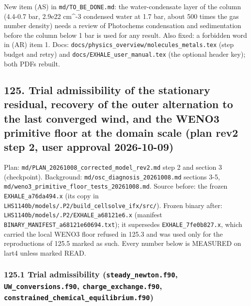 \documentclass[english,a4paper]{my_memo}
\begin{document}
New item (AS) in \texttt{md/TO\_BE\_DONE.md}: the water-condensate layer of the column
(4.4-0.7 bar, 2.9e22 cm\^{}-3 condensed water at 1.7 bar, about 500 times the gas
number density) needs a review of Photochem\textquotesingle s condensation and sedimentation before
the column below 1 bar is used for any result. Also fixed: a forbidden word in
(AR) item 1. Docs: \texttt{docs/physics\_overview/molecules\_metals.tex} (step budget and
retry) and \texttt{docs/EXHALE\_user\_manual.tex} (the optional header key); both PDFs
rebuilt.

\subsection{125. Trial admissibility of the stationary residual, recovery of the outer alternation to the last converged wind, and the WENO3 primitive floor at the domain scale (plan rev2 step 2, user approval 2026-10-09)}\label{125-trial-admissibility-of-the-stationary-residual-recovery-of-the-outer-alternation-to-the-last-converged-wind-and-the-weno3-primitive-floor-at-the-domain-scale-plan-rev2-step-2-user-approval-2026-10-09}

Plan: \texttt{md/PLAN\_20261008\_corrected\_model\_rev2.md} step 2 and section 3 (checkpoint). Background: \texttt{md/osc\_diagnosis\_20261008.md} sections 3-5, \texttt{md/weno3\_primitive\_floor\_tests\_20261008.md}. Source before: the frozen \texttt{EXHALE\_a76da494.x} (its copy in \texttt{LHS1140b/models/.P2/build\_cellsolve\_ifx/src/}). Frozen binary after: \texttt{LHS1140b/models/.P2/EXHALE\_a68121e6.x} (manifest \texttt{BINARY\_MANIFEST\_a68121e60694.txt}); it supersedes \texttt{EXHALE\_7fe0b827.x}, which carried the local WENO3 floor refused in 125.3 and was used only for the reproductions of 125.5 marked as such. Every number below is MEASURED on lart4 unless marked READ.

\subsubsection{\texorpdfstring{125.1 Trial admissibility (\texttt{steady\_newton.f90}, \texttt{UW\_conversions.f90}, \texttt{charge\_exchange.f90}, \texttt{constrained\_chemical\_equilibrium.f90})}{125.1 Trial admissibility (steady\_newton.f90, UW\_conversions.f90, charge\_exchange.f90, constrained\_chemical\_equilibrium.f90)}}\label{1251-trial-admissibility-steady_newtonf90-uw_conversionsf90-charge_exchangef90-constrained_chemical_equilibriumf90}
\end{document}
